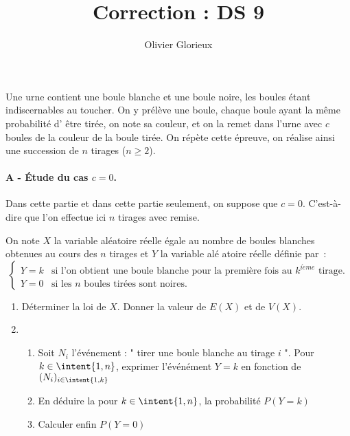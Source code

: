 \documentclass[a4paper, 11pt,reqno]{article}
\author{Olivier Glorieux}
\begin{document}
\title{Correction : DS 9 
}


\begin{exercice}




Une urne contient une boule blanche et une boule noire, les boules \'etant
indiscernables au toucher. On y pr\'el\`eve une boule, chaque boule ayant la m\^{e}me probabilit\'e d'%
\^{e}tre tir\'ee, on note sa couleur, et on la remet dans l'urne avec $c$
boules de la couleur de la boule tir\'ee. On r\'ep\`ete cette \'epreuve, on
r\'ealise ainsi une succession de $n$ tirages ($n\geqslant 2$).

\paragraph{\small{A - \'Etude du cas $c=0$.}\\}
Dans cette partie et dans cette partie seulement, on suppose que $c=0$. C'est-à-dire que l'on  effectue  ici $n$ tirages avec remise.

On note $X$ la variable al\'{e}atoire r\'{e}elle \'{e}gale au nombre de
boules blanches obtenues au cours des $n$ tirages et $Y$ la variable al\'{e}%
atoire r\'{e}elle d\'{e}finie par~: 
\begin{equation*}
\begin{cases}
Y=k & \text{si l'on obtient une boule blanche pour la premi\`{e}re fois au }%
k^{i\grave{e}me}\text{ tirage.} \\ 
Y=0 & \text{si les $n$ boules tir\'{e}es sont noires.}%
\end{cases}%
\end{equation*}

\begin{enumerate}
\item D\'{e}terminer la loi de $X$. Donner la valeur de $E(X)$ et de $V(X)$.

\item 
\begin{enumerate}
\item Soit $N_i$ l'événement : " tirer une boule blanche au tirage $i$ ". Pour $k\in \intent{1,n}$, exprimer l'événément $Y=k$ en fonction de $(N_i)_{i\in \intent{1,k}}$
\item En déduire la pour  $k\in \intent{1,n}$, la probabilit\'{e} $P(Y=k) $
\item Calculer enfin $P(Y=0)$
\end{enumerate}



\end{enumerate}
\end{exercice}
\end{document}
